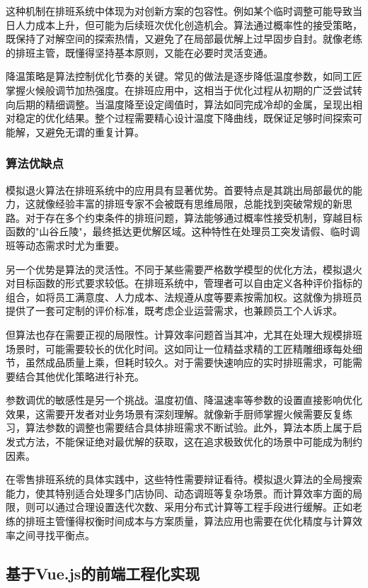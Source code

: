 \documentclass{ctexart}
\begin{document}
这种机制在排班系统中体现为对创新方案的包容性。例如某个临时调整可能导致当日人力成本上升，但可能为后续班次优化创造机会。算法通过概率性的接受策略，既保持了对解空间的探索热情，又避免了在局部最优解上过早固步自封。就像老练的排班主管，既懂得坚持基本原则，又能在必要时灵活变通。

降温策略是算法控制优化节奏的关键。常见的做法是逐步降低温度参数，如同工匠掌握火候般调节加热强度。在排班应用中，这相当于优化过程从初期的广泛尝试转向后期的精细调整。当温度降至设定阈值时，算法如同完成冷却的金属，呈现出相对稳定的优化结果。整个过程需要精心设计温度下降曲线，既保证足够时间探索可能解，又避免无谓的重复计算。

\subsubsection{算法优缺点}
模拟退火算法在排班系统中的应用具有显著优势。首要特点是其跳出局部最优的能力，这就像经验丰富的排班专家不会被既有思维局限，总能找到突破常规的新思路。对于存在多个约束条件的排班问题，算法能够通过概率性接受机制，穿越目标函数的"山谷丘陵"，最终抵达更优解区域。这种特性在处理员工突发请假、临时调班等动态需求时尤为重要。

另一个优势是算法的灵活性。不同于某些需要严格数学模型的优化方法，模拟退火对目标函数的形式要求较低。在排班系统中，管理者可以自由定义各种评价指标的组合，如将员工满意度、人力成本、法规遵从度等要素按需加权。这就像为排班员提供了一套可定制的评价标准，既考虑企业运营需求，也兼顾员工个人诉求。

但算法也存在需要正视的局限性。计算效率问题首当其冲，尤其在处理大规模排班场景时，可能需要较长的优化时间。这如同让一位精益求精的工匠精雕细琢每处细节，虽然成品质量上乘，但耗时较久。对于需要快速响应的实时排班需求，可能需要结合其他优化策略进行补充。

参数调优的敏感性是另一个挑战。温度初值、降温速率等参数的设置直接影响优化效果，这需要开发者对业务场景有深刻理解。就像新手厨师掌握火候需要反复练习，算法参数的调整也需要结合具体排班需求不断试验。此外，算法本质上属于启发式方法，不能保证绝对最优解的获取，这在追求极致优化的场景中可能成为制约因素。

在零售排班系统的具体实践中，这些特性需要辩证看待。模拟退火算法的全局搜索能力，使其特别适合处理多门店协同、动态调班等复杂场景。而计算效率方面的局限，则可以通过合理设置迭代次数、采用分布式计算等工程手段进行缓解。正如老练的排班主管懂得权衡时间成本与方案质量，算法应用也需要在优化精度与计算效率之间寻找平衡点。

\subsection{基于Vue.js的前端工程化实现}
\end{document}
